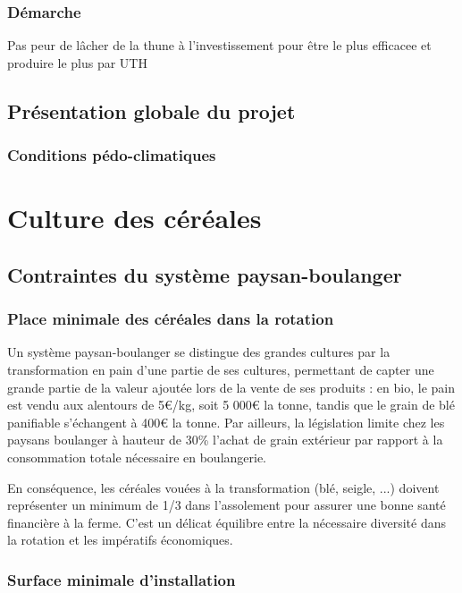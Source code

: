 \documentclass{book}
\begin{document}
\subsection{Démarche}

Pas peur de lâcher de la thune à l'investissement pour être le plus efficacee et produire le plus par UTH

\section{Présentation globale du projet}

\subsection{Conditions pédo-climatiques}

\chapter{Culture des céréales}

\section{Contraintes du système paysan-boulanger}

\subsection{Place minimale des céréales dans la rotation}

Un système paysan-boulanger se distingue des grandes cultures par la transformation en pain d'une partie de ses cultures, permettant de capter une grande partie de la valeur ajoutée lors de la vente de ses produits : en bio, le pain est vendu aux alentours de 5\euro{}/kg, soit 5 000\euro{} la tonne, tandis que le grain de blé panifiable s'échangent à 400\euro{} la tonne. Par ailleurs, la législation limite chez les paysans boulanger à hauteur de 30\% l'achat de grain extérieur par rapport à la consommation totale nécessaire en boulangerie. 

En conséquence, les céréales vouées à la transformation (blé, seigle, ...) doivent représenter un minimum de 1/3 dans l'assolement pour assurer une bonne santé financière à la ferme. C'est un délicat équilibre entre la nécessaire diversité dans la rotation et les impératifs économiques.

\subsection{Surface minimale d'installation}
\end{document}
